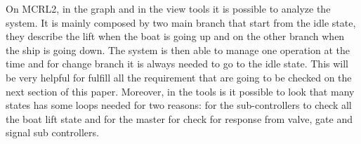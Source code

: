 On MCRL2, in the graph and in the view tools it is possible to analyze the system. It is mainly composed by two main branch that start from the idle state, they describe the lift when the boat is going up and on the other branch when the ship is going down. The system is then able to manage one operation at the time and for change branch it is always needed to go to the idle state. This will be very helpful for fulfill all the requirement that are going to be checked on the next section of this paper. Moreover, in the tools is it possible to look that many states has some loops needed for two reasons: for the sub-controllers to check all the boat lift state and for the master for check for response from valve, gate and signal sub controllers.

